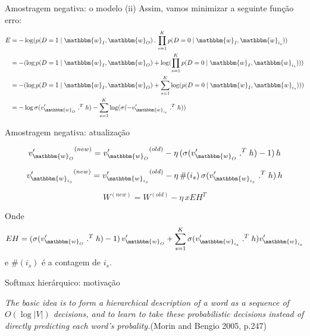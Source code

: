 \documentclass{beamer}
\newcommand{\wo}{\mathbbm{w}}
\begin{document}
\begin{frame}[fragile]{Amostragem negativa: o modelo (ii)}
Assim, vamos minimizar a seguinte função erro:
\begin{align*}
E & = -\log (p(D=1 \;|\; \wo_I,\wo_{O}) \, .\, \prod_{s=1}^{K} p(D=0 \;|\; \wo_I,\wo_{i_{s}})) \\
& = - (\log p(D=1 \;|\; \wo_I,\wo_{O}) + \log(\prod_{s=1}^{K} p(D=0 \;|\; \wo_I,\wo_{i_{s}})))\\
& = - (\log p(D=1 \;|\; \wo_I,\wo_{O}) + \sum_{s=1}^{K}\log(p(D=0 \;|\; \wo_I,\wo_{i_{s}})))\\
& = - \log \sigma(v_{\wo_O}^{\prime} \; .^{T} \; h) - \sum_{s=1}^{K}\log(\sigma(- v_{\wo_{i_{s}}}^{\prime} \; .^{T} \; h))\\
\end{align*}
\end{frame}

\begin{frame}[fragile]{Amostragem negativa: atualização}

\begin{equation}\label{eq:23}
{v^{\prime}_{\wo_{O}}}^{(new)} = {v^{\prime}_{\wo_{O}}}^{(old)} - \eta \, (\sigma( v_{\wo_{O}}^{\prime} \; .^{T} \; h) -1) \, h
\end{equation}

\begin{equation}\label{eq:24}
{v^{\prime}_{\wo_{i_{s}}}}^{(new)} = {v^{\prime}_{\wo_{i_{s}}}}^{(old)} - \eta \, \#(i_{s})  \, \sigma(v_{\wo_{i_{s}}}^{\prime} \; .^{T} \; h) \, h
\end{equation}

\begin{equation}\label{eq:25}
W^{(new)} = W^{(old)} - \eta \, x EH^{T}
\end{equation}

\vspace{0.3cm}
Onde 
\[
EH = (\sigma(v_{\wo_{O}}^{\prime} \; .^{T} \; h) -1) \, v_{\wo_{O}}^{\prime} + \sum_{s=1}^{K}\sigma(v_{\wo_{i_{s}}}^{\prime} \; .^{T} \; h)v_{\wo_{i_{s}}}^{\prime}
\]
e $\#(i_{s})$ é a contagem de $i_{s}$.
\end{frame}


\begin{frame}[fragile]{Softmax hierárquico: motivação}
\begin{displayquote}
\textit{The basic idea is to form a hierarchical description of a word as a sequence of $O(\log |V|)$ decisions, and to learn to take these probabilistic decisions instead of directly predicting each word's probality.}(Morin and Bengio 2005, p.247)
\end{displayquote}


\end{frame}
\end{document}
